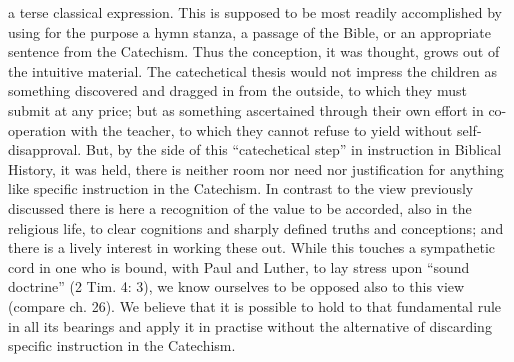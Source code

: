 a terse classical expression. This is supposed to be most readily accomplished by using for the purpose a hymn stanza, a passage of the Bible, or an appropriate sentence from the Catechism. Thus the conception, it was thought, grows out of the intuitive material. The catechetical thesis would not impress the children as something discovered and dragged in from the outside, to which they must submit at any price; but as something ascertained through their own effort in co-operation with the teacher, to which they cannot refuse to yield without self-disapproval. But, by the side of this “catechetical step” in instruction in Biblical History, it was held, there is neither room nor need nor justification for anything like specific instruction in the Catechism. In contrast to the view previously discussed there is here a recognition of the value to be accorded, also in the religious life, to clear cognitions and sharply defined truths and conceptions; and there is a lively interest in working these out. While this touches a sympathetic cord in one who is bound, with Paul and Luther, to lay stress upon “sound doctrine” (2 Tim. 4: 3), we know ourselves to be opposed also to this view (compare ch. 26). We believe that it is possible to hold to that fundamental rule in all its bearings and apply it in practise without the alternative of discarding specific instruction in the Catechism.

